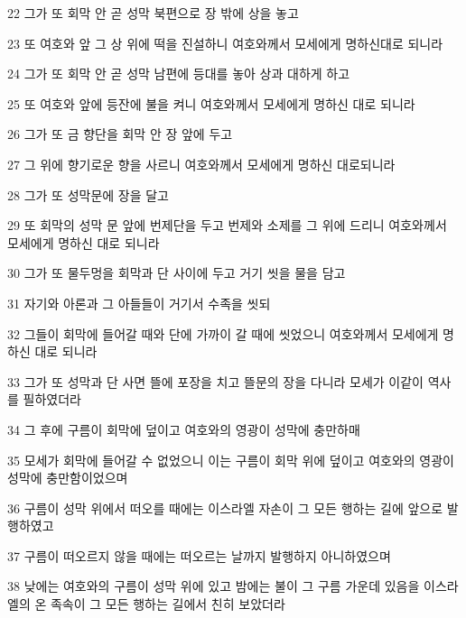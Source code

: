 \par 22 그가 또 회막 안 곧 성막 북편으로 장 밖에 상을 놓고
\par 23 또 여호와 앞 그 상 위에 떡을 진설하니 여호와께서 모세에게 명하신대로 되니라
\par 24 그가 또 회막 안 곧 성막 남편에 등대를 놓아 상과 대하게 하고
\par 25 또 여호와 앞에 등잔에 불을 켜니 여호와께서 모세에게 명하신 대로 되니라
\par 26 그가 또 금 향단을 회막 안 장 앞에 두고
\par 27 그 위에 향기로운 향을 사르니 여호와께서 모세에게 명하신 대로되니라
\par 28 그가 또 성막문에 장을 달고
\par 29 또 회막의 성막 문 앞에 번제단을 두고 번제와 소제를 그 위에 드리니 여호와께서 모세에게 명하신 대로 되니라
\par 30 그가 또 물두멍을 회막과 단 사이에 두고 거기 씻을 물을 담고
\par 31 자기와 아론과 그 아들들이 거기서 수족을 씻되
\par 32 그들이 회막에 들어갈 때와 단에 가까이 갈 때에 씻었으니 여호와께서 모세에게 명하신 대로 되니라
\par 33 그가 또 성막과 단 사면 뜰에 포장을 치고 뜰문의 장을 다니라 모세가 이같이 역사를 필하였더라
\par 34 그 후에 구름이 회막에 덮이고 여호와의 영광이 성막에 충만하매
\par 35 모세가 회막에 들어갈 수 없었으니 이는 구름이 회막 위에 덮이고 여호와의 영광이 성막에 충만함이었으며
\par 36 구름이 성막 위에서 떠오를 때에는 이스라엘 자손이 그 모든 행하는 길에 앞으로 발행하였고
\par 37 구름이 떠오르지 않을 때에는 떠오르는 날까지 발행하지 아니하였으며
\par 38 낮에는 여호와의 구름이 성막 위에 있고 밤에는 불이 그 구름 가운데 있음을 이스라엘의 온 족속이 그 모든 행하는 길에서 친히 보았더라


